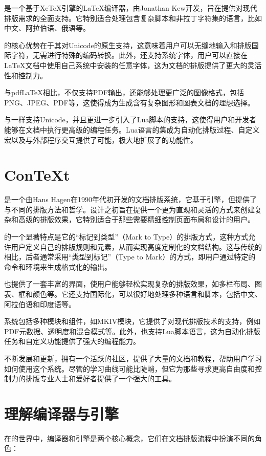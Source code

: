 是一个基于XeTeX引擎的LaTeX编译器，由Jonathan Kew开发，旨在提供对现代排版需求的全面支持。它特别适合处理包含复杂脚本和非拉丁字符集的语言，比如中文、阿拉伯语、俄语等。

的核心优势在于其对Unicode的原生支持，这意味着用户可以无缝地输入和排版国际字符，无需进行特殊的编码转换。此外，还支持系统字体，用户可以直接在LaTeX文档中使用自己系统中安装的任意字体，这为文档的排版提供了更大的灵活性和控制力。

与pdfLaTeX相比，不仅支持PDF输出，还能够处理更广泛的图像格式，包括PNG、JPEG、PDF等，这使得成为生成含有复杂图形和图表文档的理想选择。

与一样支持Unicode，并且更进一步引入了Lua脚本的支持，这使得用户和开发者能够在文档中执行更高级的编程任务。Lua语言的集成为自动化排版过程、自定义宏以及与外部程序交互提供了可能，极大地扩展了的功能性。

\section{ConTeXt}
是一个由Hans Hagen在1990年代初开发的文档排版系统，它基于引擎，但提供了与不同的排版方法和哲学。设计之初旨在提供一个更为直观和灵活的方式来创建复杂和高级的排版效果，它特别适合于那些需要精细控制页面布局和设计的用户。

的一个显著特点是它的“标记到类型”（Mark to
Type）的排版方式，这种方式允许用户定义自己的排版规则和元素，从而实现高度定制化的文档结构。这与传统的
相比，后者通常采用“类型到标记”（Type to Mark）的方式，即用户通过特定的命令和环境来生成格式化的输出。

也提供了一套丰富的界面，使用户能够轻松实现复杂的排版效果，如多栏布局、图表、框和颜色等。它还支持国际化，可以很好地处理多种语言和脚本，包括中文、阿拉伯语和印度语等。

系统包括多种模块和组件，如MKIV模块，它提供了对现代排版技术的支持，例如PDF元数据、透明度和混合模式等。此外，也支持Lua脚本语言，这为自动化排版任务和自定义功能提供了强大的编程能力。

不断发展和更新，拥有一个活跃的社区，提供了大量的文档和教程，帮助用户学习如何使用这个系统。尽管的学习曲线可能比陡峭，但它为那些寻求更高自由度和控制力的排版专业人士和爱好者提供了一个强大的工具。

\section{理解编译器与引擎}
在的世界中，编译器和引擎是两个核心概念，它们在文档排版流程中扮演不同的角色：

